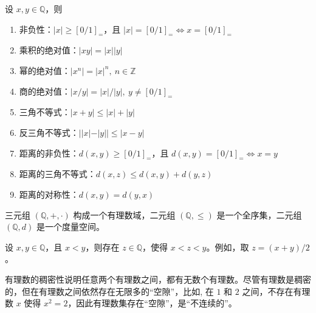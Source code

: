 \vspace{1em}

\begin{theorem}[有理数绝对值的性质]
    设 $x,y\in\mathbb{Q}$，则
    \begin{enumerate}
        \item 非负性：$|x|\geq [0/1]_{=}$，且 $|x|=[0/1]_{=} \iff x=[0/1]_{=}$
        \item 乘积的绝对值：$|xy| = |x||y|$
        \item 幂的绝对值：$|x^n| = |x|^n,\ n\in\mathbb{Z}$
        \item 商的绝对值：$|x/y| = |x|/|y|,\ y\neq [0/1]_{=}$
        \item 三角不等式：$|x+y| \leq |x| + |y|$
        \item 反三角不等式：$||x| - |y|| \leq |x - y|$
        \item 距离的非负性：$d(x,y) \geq [0/1]_{=}$，且 $d(x,y)=[0/1]_{=} \iff x=y$
        \item 距离的三角不等式：$d(x,z) \leq d(x,y) + d(y,z)$
        \item 距离的对称性：$d(x,y) = d(y,x)$
    \end{enumerate}
\end{theorem}

\begin{note}
    三元组 $(\mathbb{Q},+,\cdot)$ 构成一个有理数域，二元组 $(\mathbb{Q},\leq)$ 是一个全序集，二元组 $(\mathbb{Q},d)$ 是一个度量空间。
\end{note}

\vspace{1em}

\begin{proposition}
    设 $x,y\in\mathbb{Q}$，且 $x<y$，则存在 $z\in\mathbb{Q}$，使得 $x<z<y$。例如，取 $z=(x+y)/2$。
\end{proposition}

\begin{note}
    有理数的稠密性说明任意两个有理数之间，都有无数个有理数。尽管有理数是稠密的，但在有理数之间依然存在无限多的“空隙”，比如, 在 $1$ 和 $2$ 之间，不存在有理数 $x$ 使得 $x^2=2$，因此有理数集存在“空隙”，是“不连续的”。
\end{note}




\newpage
